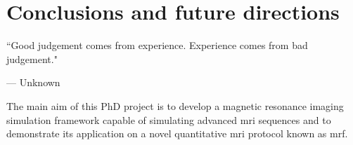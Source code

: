 \chapter{Conclusions and future directions}
\label{chapterlabel4}
\epigraph{``Good judgement comes from experience. Experience comes from bad judgement."}{--- \textup{Unknown}}


The main aim of this PhD project is to develop a magnetic resonance imaging simulation framework capable of simulating advanced \ac{mri} sequences and to demonstrate its application on a novel quantitative \ac{mri} protocol known as \ac{mrf}.







